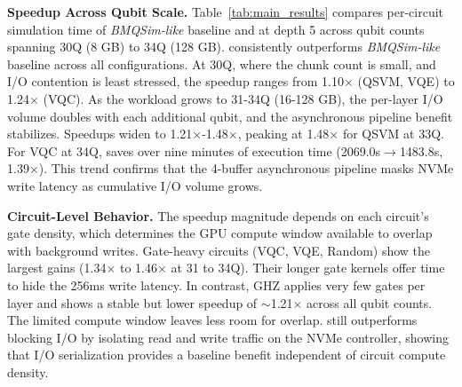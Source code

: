 \noindent\textbf{Speedup Across Qubit Scale.} Table~\ref{tab:main_results} compares per-circuit simulation time of \textit{BMQSim-like} baseline and \EdgeQuantum at depth 5 across qubit counts spanning 30Q (8 GB) to 34Q (128 GB). \EdgeQuantum consistently outperforms \textit{BMQSim-like} baseline across all configurations. At 30Q, where the chunk count is small, and I/O contention is least stressed, the speedup ranges from 1.10$\times$ (QSVM, VQE) to 1.24$\times$ (VQC). As the workload grows to 31-34Q (16-128 GB), the per-layer I/O volume doubles with each additional qubit, and the asynchronous pipeline benefit stabilizes. Speedups widen to 1.21$\times$-1.48$\times$, peaking at 1.48$\times$ for QSVM at 33Q. For VQC at 34Q, \EdgeQuantum saves over nine minutes of execution time (2069.0s$\rightarrow$1483.8s, 1.39$\times$). This trend confirms that the 4-buffer asynchronous pipeline masks NVMe write latency as cumulative I/O volume grows.

\noindent\textbf{Circuit-Level Behavior.} The speedup magnitude depends on each circuit's gate density, which determines the GPU compute window available to overlap with background writes. Gate-heavy circuits (VQC, VQE, Random) show the largest gains (1.34$\times$ to 1.46$\times$ at 31 to 34Q). Their longer gate kernels offer time to hide the 256ms write latency. In contrast, GHZ applies very few gates per layer and shows a stable but lower speedup of $\sim$1.21$\times$ across all qubit counts. The limited compute window leaves less room for overlap. \EdgeQuantum still outperforms blocking I/O by isolating read and write traffic on the NVMe controller, showing that I/O serialization provides a baseline benefit independent of circuit compute density.

